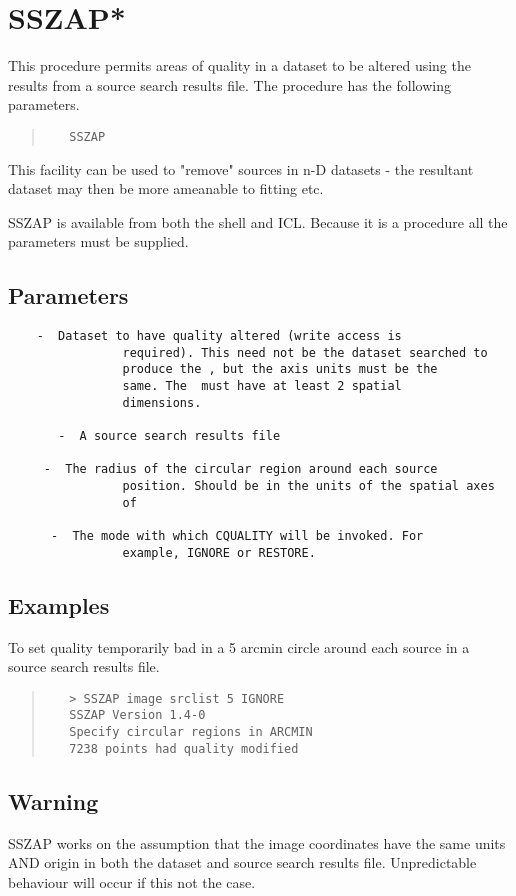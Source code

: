 \documentclass{book}
\renewcommand{\_}{{\tt\char'137}}     %
\begin{document}
\section{SSZAP*}
This procedure permits areas of quality in a dataset to be altered
using the results from a source search results file. The procedure
has the following parameters.
\begin{quote}\begin{verbatim}
   SSZAP    
 \end{verbatim}\end{quote}
This facility can be used to "remove" sources in n-D datasets -
the resultant dataset may then be more ameanable to fitting etc.
 
SSZAP is available from both the shell and ICL. Because it is a procedure
all the parameters must be supplied.
 
\subsection{Parameters}
\begin{verbatim}
    -  Dataset to have quality altered (write access is
                required). This need not be the dataset searched to
                produce the , but the axis units must be the
                same. The  must have at least 2 spatial
                dimensions.
 
       -  A source search results file
 
     -  The radius of the circular region around each source
                position. Should be in the units of the spatial axes
                of 
 
      -  The mode with which CQUALITY will be invoked. For
                example, IGNORE or RESTORE.
\end{verbatim}\subsection{Examples}
To set quality temporarily bad in a 5 arcmin circle around each
source in a source search results file.
\begin{quote}\begin{verbatim}
   > SSZAP image srclist 5 IGNORE
   SSZAP Version 1.4-0
   Specify circular regions in ARCMIN
   7238 points had quality modified
 \end{verbatim}\end{quote}
\subsection{Warning}
SSZAP works on the assumption that the image coordinates have the
same units AND origin in both the dataset and source search results
file. Unpredictable behaviour will occur if this not the case.
 
\end{document}
